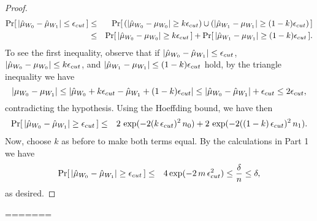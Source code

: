 \begin{proof}
\begin{eqnarray*}
\Pr [\, |\hat{\mu}_{W_0} - \hat{\mu}_{W_1}| \le  \epsilon_{cut} \,] &\le& 
\Pr [\, (|\hat{\mu}_{W_0} - {\mu}_{W_0}| \ge  k \epsilon_{cut} ) \cup (|\hat{\mu}_{W_1} - {\mu}_{W_1}| \ge  (1-k)\epsilon_{cut} )\,]  \\   
&\le&\Pr [\, |\hat{\mu}_{W_0} - {\mu}_{W_0}| \ge  k \epsilon_{cut} \,] +  
\Pr [\, |\hat{\mu}_{W_1} - {\mu}_{W_1}| \ge  (1-k) \epsilon_{cut} \,]. 
\end{eqnarray*}
%
To see the first inequality, observe that if $|\hat{\mu}_{W_0} - \hat{\mu}_{W_1}| \le  \epsilon_{cut}$, 
$|\hat{\mu}_{W_0} - {\mu}_{W_0}| \le  k \epsilon_{cut}$, 
and $|\hat{\mu}_{W_1} - {\mu}_{W_1}| \le  (1-k) \epsilon_{cut}$
hold, by the triangle inequality we have 
$$
|{\mu}_{W_0} - {\mu}_{W_1}| \le |\hat{\mu}_{W_0} + k\epsilon_{cut} - \hat{\mu}_{W_1} + (1-k)\epsilon_{cut}| 
\le |\hat{\mu}_{W_0}-\hat{\mu}_{W_1}| + \epsilon_{cut} \le 2\epsilon_{cut},$$
contradicting the hypothesis. 
Using the Hoeffding bound, we have then 
%
\begin{eqnarray*}
\Pr [\, |\hat{\mu}_{W_0} - \hat{\mu}_{W_1}| \ge  \epsilon_{cut} \,]   &\le&
2 \, \exp(-2(k\,\epsilon_{cut})^2 \, n_0) + 2 \, \exp(-2((1-k)\,\epsilon_{cut})^2 \, n_1). 
\end{eqnarray*} 
%
Now, choose $k$ as before to make both terms equal. By the calculations
in Part 1 we have 
%
\begin{eqnarray*}
\Pr [\, |\hat{\mu}_{W_0} - \hat{\mu}_{W_1}| \ge  \epsilon_{cut} \,]  &\le& 
4 \exp(-2 \, m \, \epsilon_{cut}^2) \le \frac{\delta}{n} \le \delta,
\end{eqnarray*} 
%
as desired. 

\end{proof}
=======

